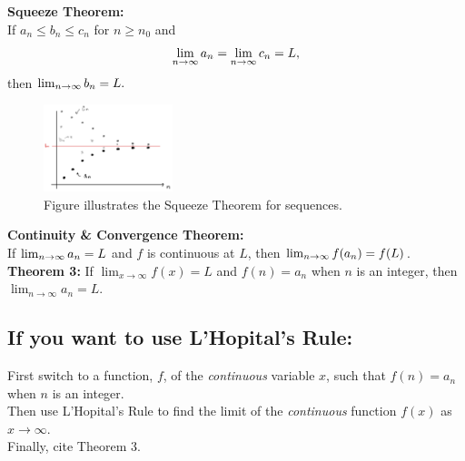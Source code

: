 \documentclass[10pt]{article}
\begin{document}
\textbf{Squeeze Theorem:}\\

If \(a_n \leq b_n \leq c_n\) for \(n \geq n_0\) and 
\[
\lim_{n\rightarrow\infty} a_n = \lim_{n\rightarrow\infty} c_n = L,
\]
then \(\lim_{n\rightarrow\infty} b_n = L.\)
~\\

\hspace*{.2in}

\begin{figure}
\begin{center}
\includegraphics[height=1in]{Ch8s1-squeeze.png}
\caption{Figure illustrates the Squeeze Theorem for sequences.}
%
\end{center}
\end{figure}



\textbf{Continuity \& Convergence Theorem:}\\
If \( \lim_{n\rightarrow\infty} a_n = L\) and \(f\) is continuous at \(L\), then \( \lim_{n\rightarrow\infty} f(a_n) = f(L)\).\\




\textbf{Theorem 3:} If \(\lim_{x\rightarrow\infty} f(x) = L\) and \(f(n)=a_n\) when \(n\) is an integer, then \(\lim_{n\rightarrow\infty} a_n = L\).\\


\vspace*{.1in}
\subsection*{If you want to use L'Hopital's Rule:}
First switch to a function, \(f\),  of the \textit{continuous} variable \(x\), such that \(f(n) = a_n\) when \(n\) is an integer.\\
Then use L'Hopital's Rule to find the limit of the \textit{continuous} function \(f(x)\) as \(x\rightarrow \infty\).\\
Finally, cite Theorem 3.





%
%
\end{document}
